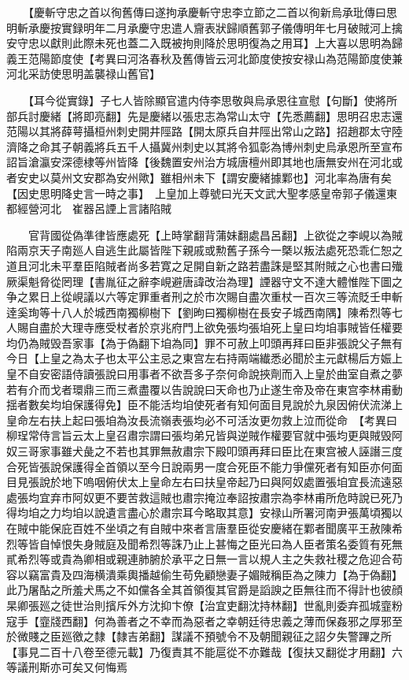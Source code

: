 　　【慶斬守忠之首以徇舊傳曰遂拘承慶斬守忠李立節之二首以徇新烏承玭傳曰思明斬承慶按實録明年二月承慶守忠遣人齎表狀歸順舊郭子儀傳明年七月破賊河上擒安守忠以獻則此際未死也蓋二入既被拘則降於思明復為之用耳】上大喜以思明為歸義王范陽節度使【考異曰河洛春秋及舊傳皆云河北節度使按安禄山為范陽節度使兼河北采訪使思明盖襲禄山舊官】

　　【耳今從實錄】子七人皆除顯官遣内侍李思敬與烏承恩往宣慰【句斷】使將所部兵討慶緒【將即亮翻】先是慶緒以張忠志為常山太守【先悉薦翻】思明召忠志還范陽以其將薛萼攝桓州刺史開井陘路【開太原兵自井陘出常山之路】招趙郡太守陸濟降之命其子朝義將兵五千人攝冀州刺史以其將令狐彰為博州刺史烏承恩所至宣布詔旨滄瀛安深德棣等州皆降【後魏置安州治方城唐檀州即其地也唐無安州在河北或者安史以莫州文安郡為安州歟】雖相州未下【謂安慶緒據鄴也】河北率為唐有矣【因史思明降史言一時之事】　上皇加上尊號曰光天文武大聖孝感皇帝郭子儀還東都經營河北　崔器呂諲上言諸陷賊

　　官背國從偽準律皆應處死【上時掌翻背蒲妹翻處昌呂翻】上欲從之李峴以為賊陷兩京天子南廵人自逃生此屬皆陛下親戚或勲舊子孫今一槩以叛法處死恐乖仁恕之道且河北未平羣臣陷賊者尚多若寛之足開自新之路若盡誅是堅其附賊之心也書曰殱厥渠魁脅從罔理【書胤征之辭李峴避唐諱改治為理】諲器守文不達大體惟陛下圖之争之累日上從峴議以六等定罪重者刑之於市次賜自盡次重杖一百次三等流貶壬申斬逹奚珣等十八人於城西南獨柳樹下【劉昫曰獨柳樹在長安子城西南隅】陳希烈等七人賜自盡於大理寺應受杖者於京兆府門上欲免張均張垍死上皇曰均垍事賊皆任權要均仍為賊毁吾家事【為于偽翻下垍為同】罪不可赦上叩頭再拜曰臣非張說父子無有今日【上皇之為太子也太平公主忌之東宫左右持兩端纎悉必聞於主元獻楊后方娠上皇不自安密語侍讀張說曰用事者不欲吾多子奈何命說挾劑而入上皇於曲室自煮之夢若有介而戈者環鼎三而三煮盡覆以告說說曰天命也乃止遂生帝及帝在東宫李林甫動揺者數矣均垍保護得免】臣不能活均垍使死者有知何面目見說於九泉因俯伏流涕上皇命左右扶上起曰張垍為汝長流嶺表張均必不可活汝更勿救上泣而從命　【考異曰柳珵常侍言旨云太上皇召肅宗謂曰張均弟兄皆與逆賊作權要官就中張均更與賊毁阿奴三哥家事雖犬彘之不若也其罪無赦肅宗下殿叩頭再拜曰臣比在東宫被人誣譖三度合死皆張說保護得全首領以至今日說兩男一度合死臣不能力爭儻死者有知臣亦何面目見張說於地下嗚咽俯伏太上皇命左右曰扶皇帝起乃曰與阿奴處置張垍宜長流遠惡處張均宜弃市阿奴更不要苦救這賊也肅宗掩泣奉詔按肅宗為李林甫所危時說已死乃得均垍之力均垍以說遺言盡心於肅宗耳今略取其意】安禄山所署河南尹張萬頃獨以在賊中能保庇百姓不坐頃之有自賊中來者言唐羣臣從安慶緒在鄴者聞廣平王赦陳希烈等皆自悼恨失身賊庭及聞希烈等誅乃止上甚悔之臣光曰為人臣者策名委質有死無貳希烈等或貴為卿相或親連肺腑於承平之日無一言以規人主之失救社稷之危迎合苟容以竊富貴及四海横潰乘輿播越偷生苟免顧戀妻子媚賊稱臣為之陳力【為于偽翻】此乃屠酟之所羞犬馬之不如儻各全其首領復其官爵是謟諛之臣無往而不得計也彼顔杲卿張廵之徒世治則擯斥外方沈抑卞僚【治宜吏翻沈持林翻】世亂則委弃孤城韲粉寇手【韲牋西翻】何為善者之不幸而為惡者之幸朝廷待忠義之薄而保姦邪之厚邪至於微賤之臣廵徼之隸【隸吉弟翻】謀議不預號令不及朝聞親征之詔夕失警蹕之所【事見二百十八卷至德元載】乃復責其不能扈從不亦難哉【復扶又翻從才用翻】六等議刑斯亦可矣又何悔焉

